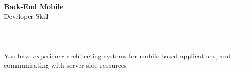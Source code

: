 \documentclass[11pt,a4paper]{memoir}
\begin{document}
    \begin{Spacing}{0.75}%
        \noindent
        \Large
        \textbf{Back-End Mobile}\\[3pt]
        \scriptsize\color{gray}Developer Skill\\ 
        \rule{\textwidth}{.3mm}\\
        
        \vspace{3mm}
        \noindent
        \begin{minipage}[t]{53mm}
            \begin{flushleft}
            {
                \normalsize
                \begin{Spacing}{1}%
                \color{black}\textrm{You have experience architecting systems for mobile-based applications, and communicating with server-side resources}\\
                \end{Spacing}
            }
            \end{flushleft}
        \end{minipage}

        \vspace{5mm}
        \noindent
        \begin{minipage}[t]{53mm}
            \begin{flushleft}
            {
                \normalsize
                \begin{Spacing}{1}%
                \color{gray}\textit{}\\
                \end{Spacing}
            }
            \end{flushleft}
        \end{minipage}
    \end{Spacing}
    \clearpage
\end{document}
